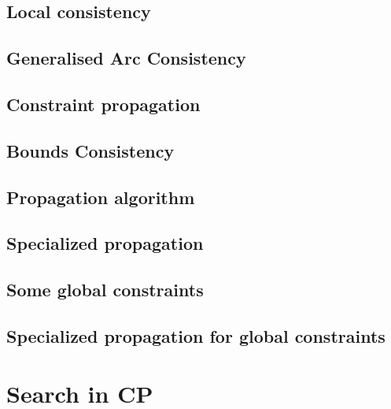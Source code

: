 \documentclass[12pt,a4paper,twoside]{book}
\begin{document}
\section{Local consistency}

\label{s_3_1}

\section{Generalised Arc Consistency}

\label{s_3_2}

\section{Constraint propagation}

\label{s_3_3}

\section{Bounds Consistency}

\label{s_3_4}

\section{Propagation algorithm}

\label{s_3_5}

\section{Specialized propagation}

\label{s_3_6}

\section{Some global constraints}

\label{s_3_7}

\section{Specialized propagation for global constraints}

\label{s_3_8}

\chapter{Search in CP}

\label{c_4}
\end{document}

